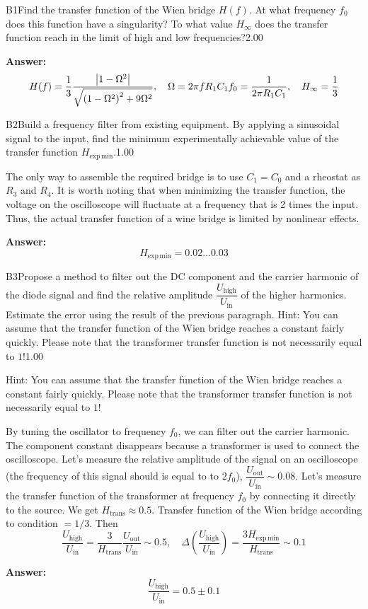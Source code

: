\documentclass[11pt,a4paper]{article}
\begin{document}
\begin{solcard}{B1}{Find the transfer function of the Wien bridge $H(f)$. At what frequency $f_0$ does this function have a singularity? To what value $H_\infty$ does the transfer function reach in the limit of high and low frequencies?}{2.00}
\par\smallskip\noindent\textbf{Answer:} \[H(f)=\frac13\frac{\left|1-\Omega^2\right|}{\sqrt{\left(1-\Omega^2\right)^2+9\Omega^2}},\quad\Omega=2\pi fR_1C_1\\f_0=\frac1{2\pi R_1C_1},\quad H_\infty=\frac13\]
\end{solcard}

\begin{solcard}{B2}{Build a frequency filter from existing equipment. By applying a sinusoidal signal to the input, find the minimum experimentally achievable value of the transfer function $H_{\text{exp}\,\text{min}}$.}{1.00}

The only way to assemble the required bridge is to use $C_1=C_0$ and a rheostat as $R_3$ and $R_4$. It is worth noting that when minimizing the transfer function, the voltage on the oscilloscope will fluctuate at a frequency that is 2 times the input. Thus, the actual transfer function of a wine bridge is limited by nonlinear effects.

\par\smallskip\noindent\textbf{Answer:} \[H_{\text{exp}\,\text{min}}=0.02\ldots0.03\]
\end{solcard}

\begin{solcard}{B3}{Propose a method to filter out the DC component and the carrier harmonic of the diode signal and find the relative amplitude $\dfrac{U_\text{high}}{U_\text{in}}$ of the higher harmonics. Estimate the error using the result of the previous paragraph. Hint: You can assume that the transfer function of the Wien bridge reaches a constant fairly quickly. Please note that the transformer transfer function is not necessarily equal to $1$!}{1.00}

Hint: You can assume that the transfer function of the Wien bridge reaches a constant fairly quickly. Please note that the transformer transfer function is not necessarily equal to $1$!


By tuning the oscillator to frequency $f_0$, we can filter out the carrier harmonic.  The component constant disappears because a transformer is used to connect the oscilloscope. Let's measure the relative amplitude of the signal on an oscilloscope (the frequency of this signal should is equal to to $2f_0$), $\dfrac{U_\text{out}}{U_\text{in}}\sim0.08$. Let's measure the transfer function of the transformer at frequency $f_0$ by connecting it directly to the source. We get $H_\text{trans}\approx0.5$. Transfer function of the Wien bridge according to condition $=1/3$. Then\[\frac{U_\text{high}}{U_\text{in}}=\frac3{H_\text{trans}}\frac{U_\text{out}}{U_\text{in}}\sim0.5,\quad\Delta\left(\frac{U_\text{high}}{U_\text{in}}\right)=\frac{3H_{\text{exp}\,\text{min}}}{H_\text{trans}}\sim0.1\]

\par\smallskip\noindent\textbf{Answer:} \[\frac{U_\text{high}}{U_\text{in}}=0.5\pm0.1\]
\end{solcard}
\end{document}
